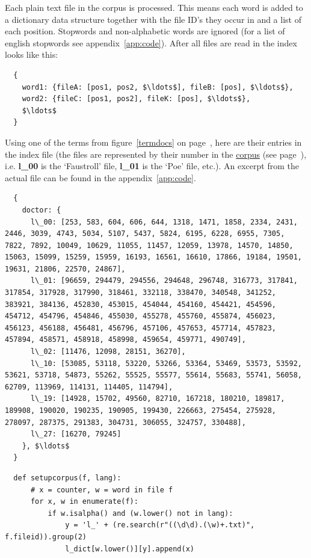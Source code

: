 Each plain text file in the corpus is processed. This means each word is added to a dictionary data structure together with the file ID's they occur in and a list of each position. Stopwords and non-alphabetic words are ignored (for a list of english stopwords see appendix~\ref{app:code}). After all files are read in the index looks like this:

\begin{verbatim}
  {
    word1: {fileA: [pos1, pos2, $\ldots$], fileB: [pos], $\ldots$},
    word2: {fileC: [pos1, pos2], fileK: [pos], $\ldots$},
    $\ldots$
  }
\end{verbatim}

Using one of the terms from figure~\ref{termdocs} on page~\pageref{termdocs}, here are their entries in the index file (the files are represented by their number in the \hyperlink{corpus}{corpus} (see page~\pageref{ref:corpus}), i.e. \textbf{l\_00} is the `Faustroll' file, \textbf{l\_01} is the `Poe' file, etc.). An excerpt from the actual file can be found in the appendix~\ref{app:code}.

\begin{verbatim}
  {
    doctor: {
      l\_00: [253, 583, 604, 606, 644, 1318, 1471, 1858, 2334, 2431, 2446, 3039, 4743, 5034, 5107, 5437, 5824, 6195, 6228, 6955, 7305, 7822, 7892, 10049, 10629, 11055, 11457, 12059, 13978, 14570, 14850, 15063, 15099, 15259, 15959, 16193, 16561, 16610, 17866, 19184, 19501, 19631, 21806, 22570, 24867],
      l\_01: [96659, 294479, 294556, 294648, 296748, 316773, 317841, 317854, 317928, 317990, 318461, 332118, 338470, 340548, 341252, 383921, 384136, 452830, 453015, 454044, 454160, 454421, 454596, 454712, 454796, 454846, 455030, 455278, 455760, 455874, 456023, 456123, 456188, 456481, 456796, 457106, 457653, 457714, 457823, 457894, 458571, 458918, 458998, 459654, 459771, 490749],
      l\_02: [11476, 12098, 28151, 36270],
      l\_10: [53085, 53118, 53220, 53266, 53364, 53469, 53573, 53592, 53621, 53718, 54873, 55262, 55525, 55577, 55614, 55683, 55741, 56058, 62709, 113969, 114131, 114405, 114794],
      l\_19: [14928, 15702, 49560, 82710, 167218, 180210, 189817, 189908, 190020, 190235, 190905, 199430, 226663, 275454, 275928, 278097, 287375, 291383, 304731, 306055, 324757, 330488],
      l\_27: [16270, 79245]
    }, $\ldots$
  }
\end{verbatim}

\begin{verbatim}
  def setupcorpus(f, lang):
      # x = counter, w = word in file f
      for x, w in enumerate(f):
          if w.isalpha() and (w.lower() not in lang):
              y = 'l_' + (re.search(r"((\d\d).(\w)+.txt)", f.fileid)).group(2)
              l_dict[w.lower()][y].append(x)
\end{verbatim}


